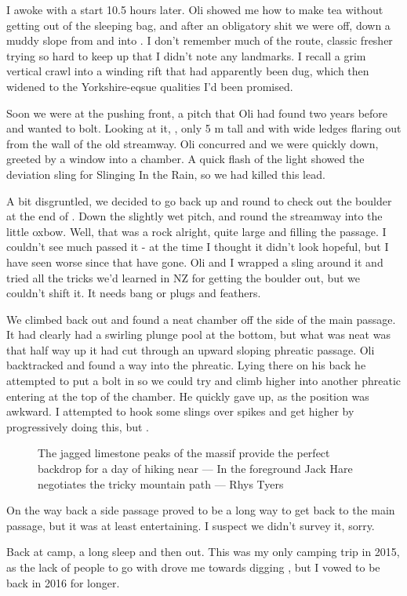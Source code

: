 I awoke with a start 10.5 hours later. Oli showed me how to make tea without getting out of the sleeping bag, and after an obligatory shit we were off, down a muddy slope from  and into . I don't remember much of the route, classic fresher trying so hard to keep up that I didn't note any landmarks. I recall a grim vertical crawl into a winding rift that had apparently been dug, which then widened to the Yorkshire-eqsue qualities I'd been promised.

Soon we were at the pushing front, a pitch that Oli had found two years before and wanted to bolt. Looking at it, , only 5 m tall and with wide ledges flaring out from the wall of the old streamway. Oli concurred and we were quickly down, greeted by a window into a chamber. A quick flash of the light showed the deviation sling for Slinging In the Rain, so we had killed this lead. 

A bit disgruntled, we decided to go back up and round to check out the boulder at the end of . Down the slightly wet pitch, and round the streamway into the little oxbow. Well, that was a rock alright, quite large and filling the passage. I couldn't see much passed it - at the time I thought it didn't look hopeful, but I have seen worse since that have gone. Oli and I wrapped a sling around it and tried all the tricks we'd learned in NZ for getting the boulder out, but we couldn't shift it. It needs bang or plugs and feathers.

We climbed back out and found a neat chamber off the side of the main passage. It had clearly had a swirling plunge pool at the bottom, but what was neat was that half way up it had cut through an upward sloping phreatic passage. Oli backtracked and found a way into the phreatic. Lying there on his back he attempted to put a bolt in so we could try and climb higher into another phreatic entering at the top of the chamber. He quickly gave up, as the position was awkward. I attempted to hook some slings over spikes and get higher by progressively doing this, but .

\begin{figure}[t!]
\checkoddpage \ifoddpage \forcerectofloat \else \forceversofloat \fi
\centering
{}
\caption{The jagged limestone peaks of the  massif provide the perfect backdrop for a day of hiking near  --- In the foreground Jack Hare negotiates the tricky mountain path --- Rhys Tyers}
\label{kukjack}
\end{figure}

On the way back a side passage proved to be a long way to get back to the main passage, but it was at least entertaining. I suspect we didn't survey it, sorry.

Back at camp, a long sleep and then out. This was my only camping trip in 2015, as the lack of people to go with drove me towards digging , but I vowed to be back in 2016 for longer.

